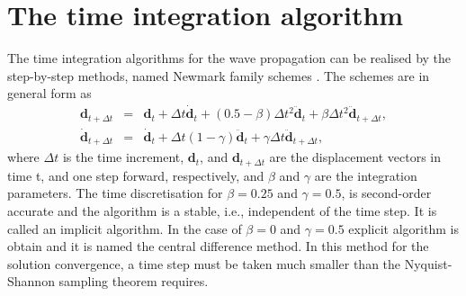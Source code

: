 \section{The time integration algorithm}
\label{sec:time}

The time integration algorithms for the wave propagation can be realised by the step-by-step methods, named Newmark family schemes \cite{newmark1959method}.
The schemes are in general form as
\begin{eqnarray}
	\label{eq:u_newmark}
	\textbf{d}_{t+\Delta t} & = & \textbf{d}_{t} +\Delta t \dot{\textbf{d}}_{t} + \left( 0.5 - \beta \right)\Delta t^2\ddot{\textbf{d}}_{t} + \beta \Delta t^2\ddot{\textbf{d}}_{t+\Delta t},\\
	\dot{\textbf{d}}_{t+\Delta t} & = & \dot{\textbf{d}}_{t} + \Delta t\left(1-\gamma\right)\ddot{\textbf{d}}_{t} + \gamma \Delta t\ddot{\textbf{d}}_{t+\Delta t},
\end{eqnarray}
%
%
where \(\Delta t\) is the time increment, \(\textbf{d}_{t}\), and \(\textbf{d}_{t+\Delta t}\) are the displacement vectors in time t, and one step forward, respectively, and \(\beta\) and \(\gamma\) are the integration parameters.
The time discretisation for \(\beta = 0.25\) and \(\gamma = 0.5\), is second-order accurate and the algorithm is a stable, i.e., independent of the time step. It is called an implicit algorithm.
In the case of \(\beta = 0\) and \(\gamma = 0.5\) explicit algorithm is obtain and it is named the central difference method.
In this method for the solution convergence, a time step must be taken much smaller than the Nyquist-Shannon sampling theorem requires.


